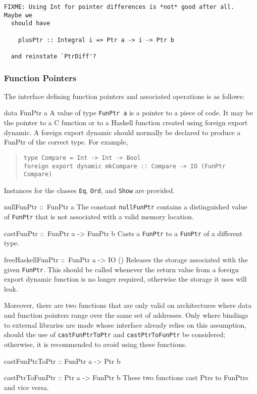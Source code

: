 \documentclass[a4paper,twosides]{article}
\makeatletter
\newcommand{\code}[1]{\texttt{#1}}      %
\newenvironment{codedesc}{%
  \list{}{\labelwidth\z@ %
    \let\makelabel\codedesclabel}
  }{%
  \endlist
  }
\newcommand*{\codedesclabel}[1]{%
  \hspace{-\leftmargin}
  \parbox[b]{\labelwidth}{\makebox[0pt][l]{\code{#1}}\\}\hfil\relax
  }
\makeatother
\begin{document}
\begin{verbatim}
FIXME: Using Int for pointer differences is *not* good after all.  Maybe we
  should have

    plusPtr :: Integral i => Ptr a -> i -> Ptr b

  and reinstate `PtrDiff'?
\end{verbatim}

\subsubsection{Function Pointers}

The interface defining function pointers and associated operations is as
follows:
%
\begin{codedesc}
\item[data FunPtr a] A value of type \code{FunPtr a} is a pointer to a piece
  of code. It may be the pointer to a C function or to a Haskell function
  created using foreign export dynamic. A foreign export dynamic should
  normally be declared to produce a FunPtr of the correct type. For example,
  \begin{quote}
\begin{verbatim}
type Compare = Int -> Int -> Bool
foreign export dynamic mkCompare :: Compare -> IO (FunPtr Compare)
\end{verbatim}
  \end{quote}
  
  Instances for the classes \code{Eq}, \code{Ord}, and \code{Show} are
  provided.
\item[nullFunPtr ::\ FunPtr a] The constant \code{nullFunPtr} contains a
  distinguished value of \code{FunPtr} that is not associated with a valid
  memory location.
\item[castFunPtr ::\ FunPtr a -> FunPtr b] Casts a \code{FunPtr} to a
  \code{FunPtr} of a different type.
\item[freeHaskellFunPtr ::\ FunPtr a -> IO ()] Releases the storage associated
  with the given \code{FunPtr}. This should be called whenever the return
  value from a foreign export dynamic function is no longer required,
  otherwise the storage it uses will leak.
\end{codedesc}

Moreover, there are two functions that are only valid on architectures where
data and function pointers range over the same set of addresses.  Only where
bindings to external libraries are made whose interface already relies on this
assumption, should the use of \code{castFunPtrToPtr} and
\code{castPtrToFunPtr} be considered; otherwise, it is recommended to avoid
using these functions.
%
\begin{codedesc}
\item[castFunPtrToPtr :: FunPtr a -> Ptr b]
\item[castPtrToFunPtr :: Ptr a -> FunPtr b] These two functions cast Ptrs to
  FunPtrs and vice versa.
\end{codedesc}
\end{document}
